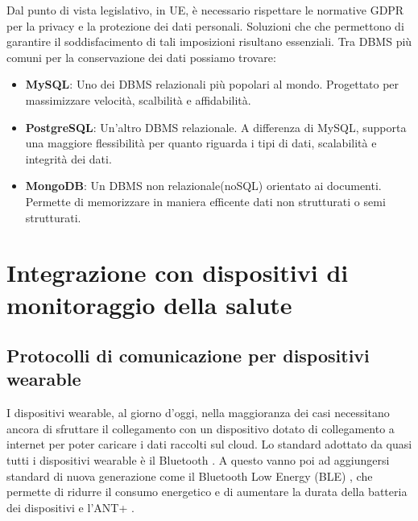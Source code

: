 \documentclass[12pt,a4paper,oneside]{report}
\begin{document}
Dal punto di vista legislativo, in UE, è necessario rispettare le normative GDPR \cite{GDPR} per la privacy e la protezione dei dati personali. Soluzioni che che permettono di garantire il soddisfacimento di tali imposizioni risultano essenziali.
Tra DBMS più comuni per la conservazione dei dati possiamo trovare:

\begin{itemize}
    \item \textbf{MySQL}: Uno dei DBMS relazionali più popolari al mondo. Progettato per massimizzare velocità, scalbilità e affidabilità. \cite{mysql}
    \item \textbf{PostgreSQL}: Un'altro DBMS relazionale. A differenza di MySQL, supporta una maggiore flessibilità per quanto riguarda i tipi di dati, scalabilità e integrità dei dati. \cite{postgresql}
    \item \textbf{MongoDB}: Un DBMS non relazionale(noSQL) orientato ai documenti. Permette di memorizzare in maniera efficente dati non strutturati o semi strutturati. \cite{mongodb}

\end{itemize}

\section{Integrazione con dispositivi di monitoraggio della salute}

\subsection{Protocolli di comunicazione per dispositivi wearable}
I dispositivi wearable, al giorno d'oggi, nella maggioranza dei casi necessitano ancora di sfruttare il collegamento con un dispositivo dotato di collegamento a internet per poter caricare i dati raccolti sul cloud.
Lo standard adottato da quasi tutti i dispositivi wearable è il Bluetooth \cite{bluetooth}. A questo vanno poi ad aggiungersi standard di nuova generazione come il Bluetooth Low Energy (BLE) \cite{ble}, che permette di ridurre il consumo energetico e di aumentare la durata della batteria dei dispositivi e l'ANT+ \cite{ant}.
\end{document}
